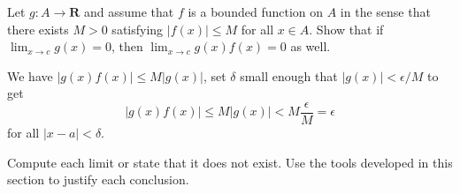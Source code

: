 \begin{exercise}
  Let $g: A \rightarrow \mathbf{R}$ and assume that $f$ is a bounded function on $A$ in the sense that there exists $M>0$ satisfying $|f(x)| \leq M$ for all $x \in A$.
Show that if $\lim _{x \rightarrow c} g(x)=0$, then $\lim _{x \rightarrow c} g(x) f(x)=0$ as well.
\end{exercise}

\begin{solution}
  We have $|g(x)f(x)| \le M|g(x)|$, set $\delta$ small enough that $|g(x)| < \epsilon/M$ to get
  $$|g(x)f(x)| \le M|g(x)| < M\frac{\epsilon}{M} = \epsilon$$
  for all $|x - a| < \delta$.
\end{solution}

\begin{exercise}
  Compute each limit or state that it does not exist. Use the tools developed in this section to justify each conclusion.
\end{exercise}

\begin{solution}
  \enum{
  \item \TODO
  \item \TODO
  \item \TODO
  \item \TODO
  }
\end{solution}

